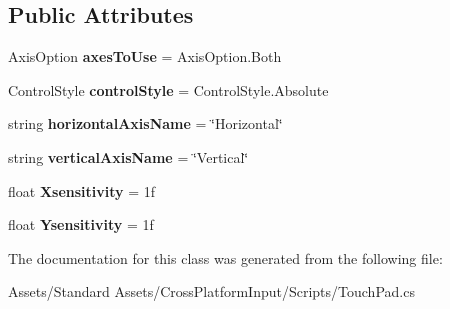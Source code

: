 \subsection*{Public Attributes}
\begin{DoxyCompactItemize}
\item 
Axis\+Option {\bfseries axes\+To\+Use} = Axis\+Option.\+Both\hypertarget{class_unity_standard_assets_1_1_cross_platform_input_1_1_touch_pad_a0ad06c7691faa5b86e3917bdab8d3eae}{}\label{class_unity_standard_assets_1_1_cross_platform_input_1_1_touch_pad_a0ad06c7691faa5b86e3917bdab8d3eae}

\item 
Control\+Style {\bfseries control\+Style} = Control\+Style.\+Absolute\hypertarget{class_unity_standard_assets_1_1_cross_platform_input_1_1_touch_pad_ad6ec0252344c6ee56d386f560e0b2240}{}\label{class_unity_standard_assets_1_1_cross_platform_input_1_1_touch_pad_ad6ec0252344c6ee56d386f560e0b2240}

\item 
string {\bfseries horizontal\+Axis\+Name} = \char`\"{}Horizontal\char`\"{}\hypertarget{class_unity_standard_assets_1_1_cross_platform_input_1_1_touch_pad_a585071611ca85f0bd127c0fd8e25f0eb}{}\label{class_unity_standard_assets_1_1_cross_platform_input_1_1_touch_pad_a585071611ca85f0bd127c0fd8e25f0eb}

\item 
string {\bfseries vertical\+Axis\+Name} = \char`\"{}Vertical\char`\"{}\hypertarget{class_unity_standard_assets_1_1_cross_platform_input_1_1_touch_pad_a1338b6e2123c8547d13f4adad495f9e0}{}\label{class_unity_standard_assets_1_1_cross_platform_input_1_1_touch_pad_a1338b6e2123c8547d13f4adad495f9e0}

\item 
float {\bfseries Xsensitivity} = 1f\hypertarget{class_unity_standard_assets_1_1_cross_platform_input_1_1_touch_pad_a32afeb376c688e6faeec4de083d1e256}{}\label{class_unity_standard_assets_1_1_cross_platform_input_1_1_touch_pad_a32afeb376c688e6faeec4de083d1e256}

\item 
float {\bfseries Ysensitivity} = 1f\hypertarget{class_unity_standard_assets_1_1_cross_platform_input_1_1_touch_pad_a2481cb2206a2127c4abe6945621752ab}{}\label{class_unity_standard_assets_1_1_cross_platform_input_1_1_touch_pad_a2481cb2206a2127c4abe6945621752ab}

\end{DoxyCompactItemize}


The documentation for this class was generated from the following file\+:\begin{DoxyCompactItemize}
\item 
Assets/\+Standard Assets/\+Cross\+Platform\+Input/\+Scripts/Touch\+Pad.\+cs\end{DoxyCompactItemize}
